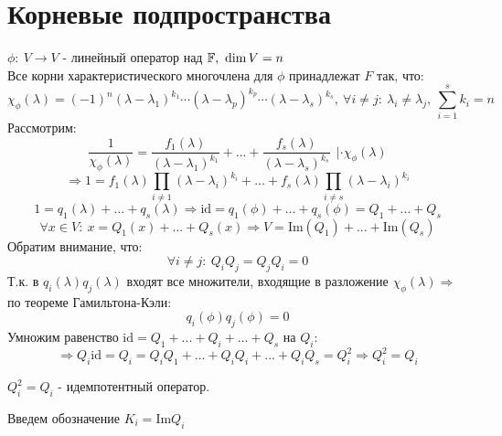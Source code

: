 \section{Корневые подпространства}
    $\phi:\ V \to V$ - линейный оператор над $\mathbb{F}, \ \dim V = n$\\
    Все корни характеристического многочлена для $\phi$ принадлежат $F$ так, что:
    $$\chi_\phi(\lambda) = (-1)^n(\lambda-\lambda_1)^{k_1} \cdots (\lambda - \lambda_p)^{k_p}\cdots (\lambda-\lambda_s)^{k_s}, \ \forall i \neq j: \  \lambda_i \neq \lambda_j, \ \sum \limits_{i=1}^sk_i = n$$
    Рассмотрим: 
    $$\frac{1}{\chi_\phi(\lambda)} = \frac{f_1(\lambda)}{(\lambda-\lambda_1)^{k_1}} + ... + \frac{f_s(\lambda)}{(\lambda-\lambda_s)^{k_s}} \ \ | \cdot \chi_\phi(\lambda)$$ $$\Longrightarrow 1 = f_1 (\lambda) \prod\limits_{i\neq 1}(\lambda-\lambda_i)^{k_i} + ... + f_s (\lambda) \prod\limits_{i\neq s}(\lambda-\lambda_i)^{k_i}$$
    $$1= q_1(\lambda) + ... + q_s(\lambda) \Longrightarrow  \text{id} = q_1(\phi) + ... + q_s(\phi) = Q_1 + ... + Q_s$$
    $$\forall x \in V: \ x=Q_1(x) + ... + Q_s(x) \Longrightarrow V = \text{Im} (Q_1) + ... + \text{Im} (Q_s)$$
    Обратим внимание, что:
    $$\forall i \neq j: \ Q_iQ_j = Q_jQ_i = 0$$
    Т.к. в $q_i(\lambda)q_j(\lambda)$ входят все множители, входящие в разложение $\chi_\phi(\lambda) \Longrightarrow $ по теореме Гамильтона-Кэли: 
    $$q_i(\phi)q_j(\phi) = 0$$
    Умножим равенство $\text{id} = Q_1+...+Q_i+...+Q_s$ на $Q_i:$ $$\Longrightarrow Q_i\text{id} = Q_i = Q_iQ_1+...+Q_iQ_i+...+Q_iQ_s = Q_i^2\Longrightarrow Q_i^2 = Q_i$$
    \begin{definition}
        $Q_i^2 = Q_i$ - идемпотентный оператор.
    \end{definition}  
    
    Введем обозначение $K_i = \text{Im}Q_i$
    
